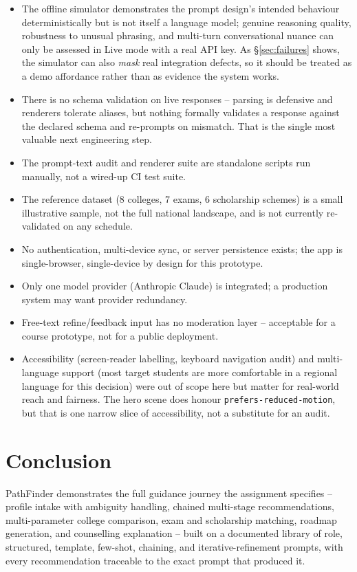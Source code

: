 \documentclass[11pt]{article}
\begin{document}
\begin{itemize}
\item The offline simulator demonstrates the prompt design's intended behaviour deterministically but is not itself a language model; genuine reasoning quality, robustness to unusual phrasing, and multi-turn conversational nuance can only be assessed in Live mode with a real API key. As \S\ref{sec:failures} shows, the simulator can also \emph{mask} real integration defects, so it should be treated as a demo affordance rather than as evidence the system works.
\item There is no schema validation on live responses -- parsing is defensive and renderers tolerate aliases, but nothing formally validates a response against the declared schema and re-prompts on mismatch. That is the single most valuable next engineering step.
\item The prompt-text audit and renderer suite are standalone scripts run manually, not a wired-up CI test suite.
\item The reference dataset (8 colleges, 7 exams, 6 scholarship schemes) is a small illustrative sample, not the full national landscape, and is not currently re-validated on any schedule.
\item No authentication, multi-device sync, or server persistence exists; the app is single-browser, single-device by design for this prototype.
\item Only one model provider (Anthropic Claude) is integrated; a production system may want provider redundancy.
\item Free-text refine/feedback input has no moderation layer -- acceptable for a course prototype, not for a public deployment.
\item Accessibility (screen-reader labelling, keyboard navigation audit) and multi-language support (most target students are more comfortable in a regional language for this decision) were out of scope here but matter for real-world reach and fairness. The hero scene does honour \texttt{prefers-reduced-motion}, but that is one narrow slice of accessibility, not a substitute for an audit.
\end{itemize}

\section{Conclusion}
PathFinder demonstrates the full guidance journey the assignment specifies -- profile intake with ambiguity handling, chained multi-stage recommendations, multi-parameter college comparison, exam and scholarship matching, roadmap generation, and counselling explanation -- built on a documented library of role, structured, template, few-shot, chaining, and iterative-refinement prompts, with every recommendation traceable to the exact prompt that produced it.
\end{document}
